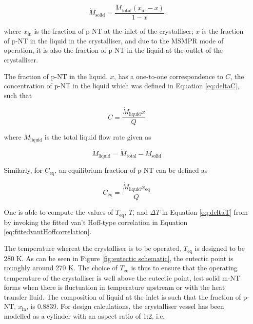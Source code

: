 \begin{equation}
    \dot{M}_{\mathrm{solid}} = \frac{\dot{M}_{\mathrm{total}} (x_{\mathrm{in}} - x)}{1 - x}
\end{equation}

\noindent where $x_{\mathrm{in}}$ is the fraction of p-NT at the inlet of the crystalliser; $x$ is the fraction of p-NT in the liquid in the crystalliser, and due to the MSMPR mode of operation, it is also the fraction of p-NT in the liquid at the outlet of the crystalliser.

The fraction of p-NT in the liquid, $x$, has a one-to-one correspondence to $C$, the concentration of p-NT in the liquid which was defined in Equation \ref{eq:deltaC}, such that 

\begin{equation}
    C = \frac{\dot{M}_{\mathrm{liquid}} x}{Q}
\end{equation}

\noindent where $\dot{M}_{\mathrm{liquid}}$ is the total liquid flow rate given as 

\begin{equation}
    \dot{M}_{\mathrm{liquid}} = \dot{M}_{\mathrm{total}} - \dot{M}_{\mathrm{solid}}
\end{equation}

\noindent Similarly, for $C_{\mathrm{eq}}$, an equilibrium fraction of p-NT can be defined as

\begin{equation}
    C_{\mathrm{eq}} = \frac{\dot{M}_{\mathrm{liquid}} x_{\mathrm{eq}}}{Q}
\end{equation}

\noindent One is able to compute the values of $T_{\mathrm{eq}}$, $T$, and $\Delta T$ in Equation \ref{eq:deltaT} from by invoking the fitted van't Hoff-type correlation in Equation \ref{eq:fittedvantHoffcorrelation}. 

The temperature whereat the crystalliser is to be operated, $T_{\mathrm{eq}}$ is designed to be 280 K. As can be seen in Figure \ref{fig:eutectic schematic}, the eutectic point is rounghly around 270 K. The choice of $T_{\mathrm{eq}}$ is thus to ensure that the operating temperature of the crystalliser is well above the eutectic point, lest solid m-NT forms when there is fluctuation in temperature upstream or with the heat transfer fluid. The composition of liquid at the inlet is such that the fraction of p-NT, $x_{\mathrm{in}}$, is 0.8839. For design calculations, the crystalliser vessel has been modelled as a cylinder with an aspect ratio of 1:2, i.e. 

